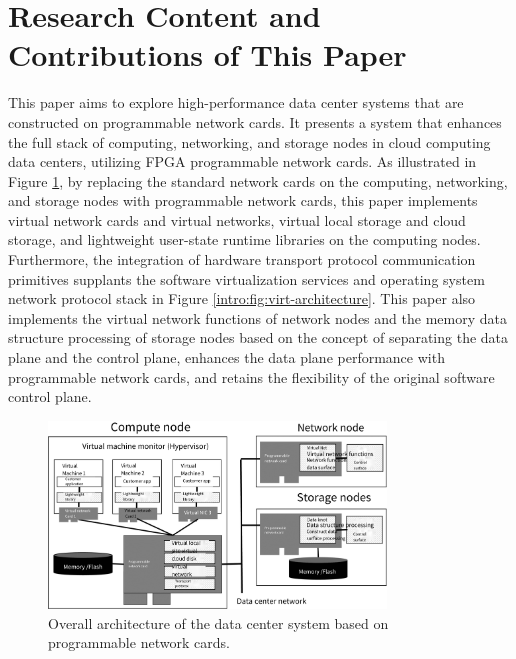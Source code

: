 \section{Research Content and Contributions of This Paper}

This paper aims to explore high-performance data center systems that are constructed on programmable network cards. It presents a system that enhances the full stack of computing, networking, and storage nodes in cloud computing data centers, utilizing FPGA programmable network cards. As illustrated in Figure \ref{intro:fig:accel-arch}, by replacing the standard network cards on the computing, networking, and storage nodes with programmable network cards, this paper implements virtual network cards and virtual networks, virtual local storage and cloud storage, and lightweight user-state runtime libraries on the computing nodes. Furthermore, the integration of hardware transport protocol communication primitives supplants the software virtualization services and operating system network protocol stack in Figure \ref{intro:fig:virt-architecture}. This paper also implements the virtual network functions of network nodes and the memory data structure processing of storage nodes based on the concept of separating the data plane and the control plane, enhances the data plane performance with programmable network cards, and retains the flexibility of the original software control plane.

\begin{figure}[htbp]
	\centering
	\includegraphics[width=0.8\textwidth]{figures/accel_arch.pdf}
	\caption{Overall architecture of the data center system based on programmable network cards.}
	\label{intro:fig:accel-arch}
\end{figure}

